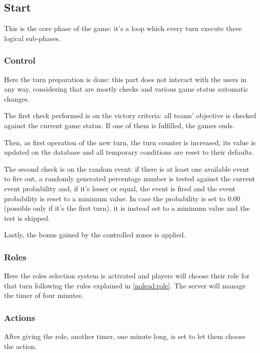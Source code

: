 		\subsection{Start}
		\label{workflow:start}
			
			This is the core phase of the game: it's a loop which every turn execute three logical sub-phases.
				
			\subsubsection{Control}
			
				Here the turn preparation is done: this part does not interact with the users in any way, considering that are mostly checks and various game status automatic changes.
			
				The first check performed is on the victory criteria: all teams' objective is checked against the current game status. If one of them is fulfilled, the games ends.
				
				Then, as first operation of the new turn, the turn counter is increased, its value is updated on the database and all temporary conditions are reset to their defaults.
				
				The second check is on the random event: if there is at least one available event to fire out, a randomly generated percentage number is tested against the current event probability and, if it's lesser or equal, the event is fired and the event probability is reset to a minimum value.
				In case the probability is set to 0.00 (possible only if it's the first turn), it is instead set to a minimum value and the test is skipped.
				
				Lastly, the bonus gained by the controlled zones is applied.
				
			\subsubsection{Roles}
			
				Here the roles selection system is activated and players will choose their role for that turn following the rules explained in \autoref{nolead:role}.
				The server will manage the timer of four minutes.
				
			\subsubsection{Actions}
				
				After giving the role, another timer, one minute long, is set to let them choose the action.
				
